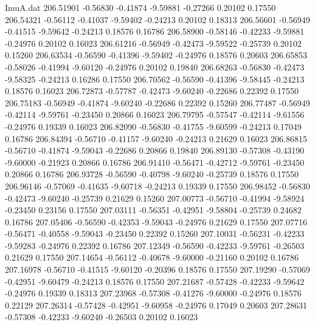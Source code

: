 \begin{filecontents}{ImuA.dat}
 206.51901   -0.56830   -0.41874   -9.59881   -0.27266    0.20102    0.17550
 206.54321   -0.56112   -0.41037   -9.59402   -0.24213    0.20102    0.18313
 206.56601   -0.56949   -0.41515   -9.59642   -0.24213    0.18576    0.16786
 206.58900   -0.58146   -0.42233   -9.59881   -0.24976    0.20102    0.16023
 206.61216   -0.56949   -0.42473   -9.59522   -0.25739    0.20102    0.15260
 206.63534   -0.56590   -0.41396   -9.59402   -0.24976    0.18576    0.20603
 206.65853   -0.58026   -0.41994   -9.60120   -0.24976    0.20102    0.19840
 206.68263   -0.56830   -0.42473   -9.58325   -0.24213    0.16286    0.17550
 206.70562   -0.56590   -0.41396   -9.58445   -0.24213    0.18576    0.16023
 206.72873   -0.57787   -0.42473   -9.60240   -0.22686    0.22392    0.17550
 206.75183   -0.56949   -0.41874   -9.60240   -0.22686    0.22392    0.15260
 206.77487   -0.56949   -0.42114   -9.59761   -0.23450    0.20866    0.16023
 206.79795   -0.57547   -0.42114   -9.61556   -0.24976    0.19339    0.16023
 206.82090   -0.56830   -0.41755   -9.60599   -0.24213    0.17049    0.16786
 206.84394   -0.56710   -0.41157   -9.60240   -0.24213    0.21629    0.16023
 206.86815   -0.56710   -0.41874   -9.59043   -0.22686    0.20866    0.19840
 206.89130   -0.57308   -0.43190   -9.60000   -0.21923    0.20866    0.16786
 206.91410   -0.56471   -0.42712   -9.59761   -0.23450    0.20866    0.16786
 206.93728   -0.56590   -0.40798   -9.60240   -0.25739    0.18576    0.17550
 206.96146   -0.57069   -0.41635   -9.60718   -0.24213    0.19339    0.17550
 206.98452   -0.56830   -0.42473   -9.60240   -0.25739    0.21629    0.15260
 207.00773   -0.56710   -0.41994   -9.58924   -0.23450    0.23156    0.17550
 207.03111   -0.56351   -0.42951   -9.58804   -0.25739    0.24682    0.16786
 207.05406   -0.56590   -0.42353   -9.59043   -0.24976    0.21629    0.17550
 207.07716   -0.56471   -0.40558   -9.59043   -0.23450    0.22392    0.15260
 207.10031   -0.56231   -0.42233   -9.59283   -0.24976    0.22392    0.16786
 207.12349   -0.56590   -0.42233   -9.59761   -0.26503    0.21629    0.17550
 207.14654   -0.56112   -0.40678   -9.60000   -0.21160    0.20102    0.16786
 207.16978   -0.56710   -0.41515   -9.60120   -0.20396    0.18576    0.17550
 207.19290   -0.57069   -0.42951   -9.60479   -0.24213    0.18576    0.17550
 207.21687   -0.57428   -0.42233   -9.59642   -0.24976    0.19339    0.18313
 207.23968   -0.57308   -0.41276   -9.60000   -0.24976    0.18576    0.22129
 207.26314   -0.57428   -0.42951   -9.60958   -0.24976    0.17049    0.20603
 207.28631   -0.57308   -0.42233   -9.60240   -0.26503    0.20102    0.16023
\end{filecontents}
